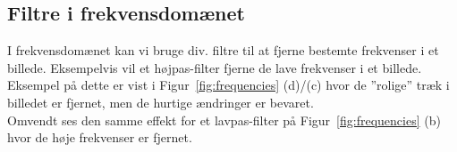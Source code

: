 \subsection{Filtre i frekvensdomænet}\label{sec:frequency-filters}

I frekvensdomænet kan vi bruge div. filtre til at fjerne bestemte frekvenser i et billede. Eksempelvis vil et højpas-filter fjerne  de lave frekvenser i et billede. Eksempel på dette er vist i Figur~\ref{fig:frequencies} (d)/(c) hvor de ''rolige'' træk i billedet er fjernet, men de hurtige ændringer er bevaret. \\

Omvendt ses den samme effekt for et lavpas-filter på Figur~\ref{fig:frequencies} (b) hvor de høje frekvenser er fjernet.

